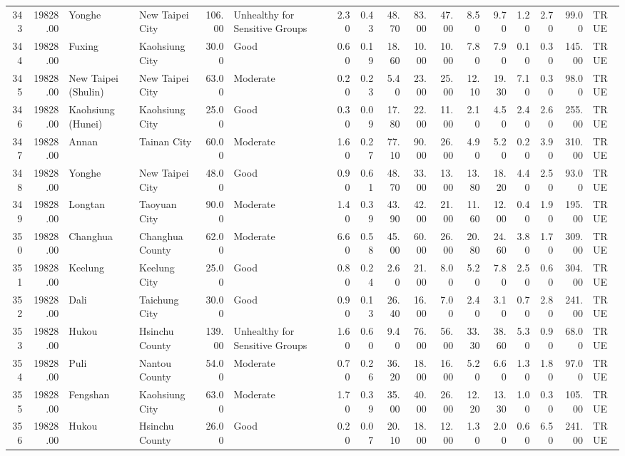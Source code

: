 \begin{table}[ht]
\begin{tabular}{rrllrlrrrrrrrrrrl}
  343 & 19828.00 & Yonghe & New Taipei City & 106.00 & Unhealthy for Sensitive Groups & 2.30 & 0.43 & 48.70 & 83.00 & 47.00 & 8.50 & 9.70 & 1.20 & 2.70 & 99.00 & TRUE \\ 
  344 & 19828.00 & Fuxing & Kaohsiung City & 30.00 & Good & 0.60 & 0.19 & 18.60 & 10.00 & 10.00 & 7.80 & 7.90 & 0.10 & 0.30 & 145.00 & TRUE \\ 
  345 & 19828.00 & New Taipei (Shulin) & New Taipei City & 63.00 & Moderate & 0.20 & 0.23 & 5.40 & 23.00 & 25.00 & 12.10 & 19.30 & 7.10 & 0.30 & 98.00 & TRUE \\ 
  346 & 19828.00 & Kaohsiung (Hunei) & Kaohsiung City & 25.00 & Good & 0.30 & 0.09 & 17.80 & 22.00 & 11.00 & 2.10 & 4.50 & 2.40 & 2.60 & 255.00 & TRUE \\ 
  347 & 19828.00 & Annan & Tainan City & 60.00 & Moderate & 1.60 & 0.27 & 77.10 & 90.00 & 26.00 & 4.90 & 5.20 & 0.20 & 3.90 & 310.00 & TRUE \\ 
  348 & 19828.00 & Yonghe & New Taipei City & 48.00 & Good & 0.90 & 0.61 & 48.70 & 33.00 & 13.00 & 13.80 & 18.20 & 4.40 & 2.50 & 93.00 & TRUE \\ 
  349 & 19828.00 & Longtan & Taoyuan City & 90.00 & Moderate & 1.40 & 0.39 & 43.90 & 42.00 & 21.00 & 11.60 & 12.00 & 0.40 & 1.90 & 195.00 & TRUE \\ 
  350 & 19828.00 & Changhua & Changhua County & 62.00 & Moderate & 6.60 & 0.58 & 45.00 & 60.00 & 26.00 & 20.80 & 24.60 & 3.80 & 1.70 & 309.00 & TRUE \\ 
  351 & 19828.00 & Keelung & Keelung City & 25.00 & Good & 0.80 & 0.24 & 2.60 & 21.00 & 8.00 & 5.20 & 7.80 & 2.50 & 0.60 & 304.00 & TRUE \\ 
  352 & 19828.00 & Dali & Taichung City & 30.00 & Good & 0.90 & 0.13 & 26.40 & 16.00 & 7.00 & 2.40 & 3.10 & 0.70 & 2.80 & 241.00 & TRUE \\ 
  353 & 19828.00 & Hukou & Hsinchu County & 139.00 & Unhealthy for Sensitive Groups & 1.60 & 0.60 & 9.40 & 76.00 & 56.00 & 33.30 & 38.60 & 5.30 & 0.90 & 68.00 & TRUE \\ 
  354 & 19828.00 & Puli & Nantou County & 54.00 & Moderate & 0.70 & 0.26 & 36.20 & 18.00 & 16.00 & 5.20 & 6.60 & 1.30 & 1.80 & 97.00 & TRUE \\ 
  355 & 19828.00 & Fengshan & Kaohsiung City & 63.00 & Moderate & 1.70 & 0.39 & 35.00 & 40.00 & 26.00 & 12.20 & 13.30 & 1.00 & 0.30 & 105.00 & TRUE \\ 
  356 & 19828.00 & Hukou & Hsinchu County & 26.00 & Good & 0.20 & 0.07 & 20.10 & 18.00 & 12.00 & 1.30 & 2.00 & 0.60 & 6.50 & 241.00 & TRUE \\ 

\end{tabular}
\end{table}
